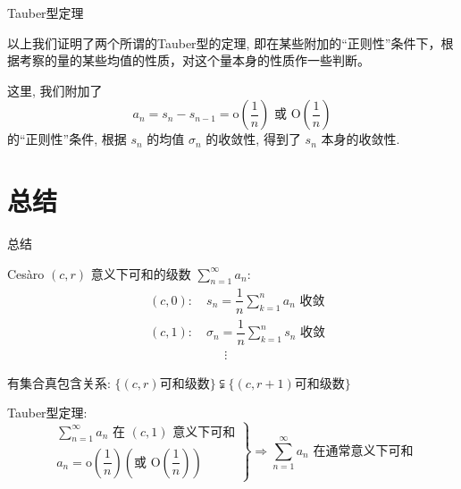 \begin{frame}{Tauber型定理}

以上我们证明了两个所谓的Tauber型的定理, 即在某些附加的“正则性”条件下，根据考察的量的某些均值的性质，对这个量本身的性质作一些判断。

\pause
\vspace{1em}

这里, 我们附加了
$$a_n = s_n - s_{n-1} = \mathrm{o}\left(\dfrac{1}{n}\right) \text{ 或 } \mathrm{O}\left(\dfrac{1}{n}\right)$$
的“正则性”条件, 根据 $s_n$ 的均值 $\sigma_n$ 的收敛性, 得到了 $s_n$ 本身的收敛性.

\end{frame}


\section{总结}


\begin{frame}{总结}

{\larger[2] \color{red} } Cesàro $(c, r)$ 意义下可和的级数 $\sum\limits_{n=1}^\infty a_n:$
\begin{align*}
  & (c, 0): \quad s_n = \dfrac{1}{n} \sum\limits_{k=1}^n a_n \text{ 收敛} \\
  & (c, 1): \quad \sigma_n = \dfrac{1}{n} \sum\limits_{k=1}^n s_n \text{ 收敛} \\
  & \phantom{++++++} \vdots
\end{align*}

\pause

{\larger[2] \color{red} } 有集合真包含关系: $\{ (c, r) \text{可和级数} \} \subsetneqq \{ (c, r + 1) \text{可和级数} \}$

\pause
\vspace{0.8em}

{\larger[2] \color{red} } Tauber型定理:
$$
\left. \begin{array}{r}
\sum\limits_{n=1}^\infty a_n \text{ 在 $(c,1)$ 意义下可和} \\
a_n = \mathrm{o} \left( \dfrac{1}{n} \right) (\text{或 } \mathrm{O} \left( \dfrac{1}{n} \right))
\end{array} \right\} \Longrightarrow \sum\limits_{n=1}^\infty a_n \text{ 在通常意义下可和}
$$

\end{frame}

